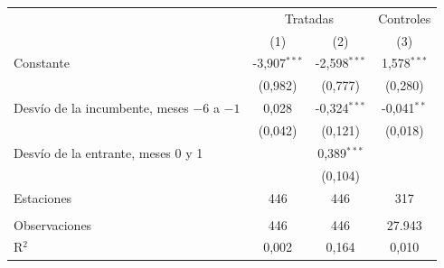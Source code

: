 \begingroup
\centering
\begin{tabular}{lccc}
   \toprule
    & \multicolumn{2}{c}{Tratadas} & Controles \\ 
                                              & (1)            & (2)            & (3)\\  
   \midrule 
   Constante                                  & -3{,}907$^{***}$ & -2{,}598$^{***}$ & 1{,}578$^{***}$\\   
                                              & (0{,}982)        & (0{,}777)        & (0{,}280)\\   
   Desvío de la incumbente, meses $-6$ a $-1$ & 0{,}028          & -0{,}324$^{***}$ & -0{,}041$^{**}$\\   
                                              & (0{,}042)        & (0{,}121)        & (0{,}018)\\   
   Desvío de la entrante, meses 0 y 1         &                & 0{,}389$^{***}$  &   \\   
                                              &                & (0{,}104)        &   \\   
   Estaciones                                 & 446            & 446            & 317\\  
    \\
   Observaciones                              & 446            & 446            & 27.943\\  
   R$^2$                                      & 0{,}002          & 0{,}164          & 0{,}010\\  
   \bottomrule
\end{tabular}
\par\endgroup

